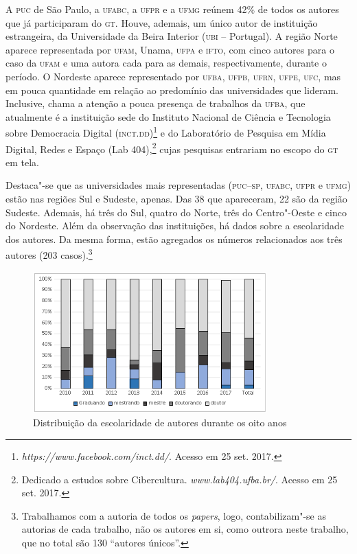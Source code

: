 
A \textsc{puc} de São Paulo, a \textsc{ufabc}, a \textsc{ufpr} e a \textsc{ufmg} reúnem 42\% de todos os
autores que já participaram do \textsc{gt}. Houve, ademais, um único autor de
instituição estrangeira, da Universidade da Beira Interior (\textsc{ubi} --
Portugal). A região Norte aparece representada por \textsc{ufam}, Unama, \textsc{ufpa} e
\textsc{ifto}, com cinco autores para o caso da \textsc{ufam} e uma autora cada para as
demais, respectivamente, durante o período. O Nordeste aparece
representado por \textsc{ufba}, \textsc{ufpb}, \textsc{ufrn}, \textsc{ufpe}, \textsc{ufc}, mas em pouca quantidade em
relação ao predomínio das universidades que lideram. Inclusive, chama a
atenção a pouca presença de trabalhos da \textsc{ufba}, que atualmente é a
instituição sede do Instituto Nacional de Ciência e Tecnologia sobre
Democracia Digital (\textsc{inct}.\textsc{dd})\footnote{\emph{https://www.facebook.com/inct.dd/}.
  Acesso em 25 set. 2017.} e do Laboratório de Pesquisa em Mídia
Digital, Redes e Espaço (Lab 404),\footnote{Dedicado a estudos sobre
  Cibercultura. \emph{www.lab404.ufba.br/}.
  Acesso em 25 set. 2017.} cujas pesquisas entrariam no escopo do \textsc{gt} em
tela.

Destaca"-se que as universidades mais representadas (\textsc{puc--sp}, \textsc{ufabc}, \textsc{ufpr}
e \textsc{ufmg}) estão nas regiões Sul e Sudeste, apenas. Das 38 que apareceram,
22 são da região Sudeste. Ademais, há três do Sul, quatro do Norte, três
do Centro"-Oeste e cinco do Nordeste. Além da observação das
instituições, há dados sobre a escolaridade dos autores. Da mesma
forma, estão agregados os números relacionados aos três autores
(203 casos).\footnote{Trabalhamos com a autoria de todos os
  \emph{papers}, logo, contabilizam"-se as autorias de cada trabalho, não
  os autores em si, como outrora neste trabalho, que no total são 130
  ``autores únicos''.}



 \begin{figure}[!ht]
 \centering
  \includegraphics[width=90mm]{./imgs/graf3_3.png}
 \caption{Distribuição da escolaridade de autores durante os oito anos\footnotemark}
 \end{figure}
 
